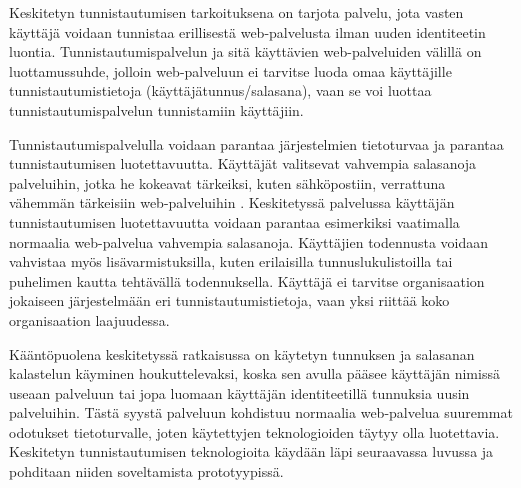 Keskitetyn tunnistautumisen tarkoituksena on tarjota palvelu, jota vasten käyttäjä voidaan tunnistaa erillisestä web-palvelusta ilman uuden identiteetin luontia. Tunnistautumispalvelun ja sitä käyttävien web-palveluiden välillä on luottamussuhde, jolloin web-palveluun ei tarvitse luoda omaa käyttäjille tunnistautumistietoja (käyttäjätunnus/salasana), vaan se voi luottaa tunnistautumispalvelun tunnistamiin käyttäjiin.

Tunnistautumispalvelulla voidaan parantaa järjestelmien tietoturvaa ja parantaa tunnistautumisen luotettavuutta. Käyttäjät valitsevat vahvempia salasanoja palveluihin, jotka he kokeavat tärkeiksi, kuten sähköpostiin, verrattuna vähemmän tärkeisiin web-palveluihin \cite{password_habits}. Keskitetyssä palvelussa käyttäjän tunnistautumisen luotettavuutta voidaan parantaa esimerkiksi vaatimalla normaalia web-palvelua vahvempia salasanoja. Käyttäjien todennusta voidaan vahvistaa myös lisävarmistuksilla, kuten erilaisilla tunnuslukulistoilla tai puhelimen kautta tehtävällä todennuksella. Käyttäjä ei tarvitse organisaation jokaiseen järjestelmään eri tunnistautumistietoja, vaan yksi riittää koko organisaation laajuudessa.

Kääntöpuolena keskitetyssä ratkaisussa on käytetyn tunnuksen ja salasanan kalastelun käyminen houkuttelevaksi, koska sen avulla pääsee käyttäjän nimissä useaan palveluun tai jopa luomaan käyttäjän identiteetillä tunnuksia uusin palveluihin. Tästä syystä palveluun kohdistuu normaalia web-palvelua suuremmat odotukset tietoturvalle, joten käytettyjen teknologioiden täytyy olla luotettavia. Keskitetyn tunnistautumisen teknologioita käydään läpi seuraavassa luvussa ja pohditaan niiden soveltamista prototyypissä.